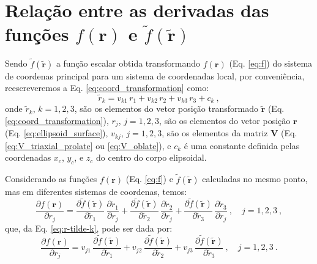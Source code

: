 \chapter{Relação entre as derivadas das funções $f(\mathbf{r})$ e $\tilde{f}(\tilde{\mathbf{r}})$}

Sendo $\tilde{f}(\tilde{\mathbf{r}})$ a função escalar obtida transformando
$f(\mathbf{r})$ (Eq. \ref{eq:f}) do sistema de coordenas principal para um 
sistema de coordenadas local, por conveniência, reescreveremos a Eq. 
\ref{eq:coord_transformation} como:
\begin{equation}
\tilde{r}_{k} = v_{k1} \, r_{1} + v_{k2} \, r_{2} + v_{k3} \, r_{3} + c_{k} \: ,
\label{eq:r-tilde-k}
\end{equation}
onde $\tilde{r}_{k}$, $k = 1, 2, 3$, são os elementos do vetor posição
transformado $\tilde{\mathbf{r}}$ (Eq. \ref{eq:coord_transformation}),
$r_{j}$, $j = 1, 2, 3$, são os elementos do vetor posição
$\mathbf{r}$ (Eq. \ref{eq:ellipsoid_surface}),
$v_{kj}$, $j = 1, 2, 3$, são os elementos da matriz
$\mathbf{V}$ (Eq. \ref{eq:V_triaxial_prolate} ou \ref{eq:V_oblate}),
e $c_{k}$ é uma constante definida pelas coordenadas
$x_{c}$, $y_{c}$, e $z_{c}$ do centro do corpo elipsoidal.

Considerando as funções $f(\mathbf{r})$ 
(Eq. \ref{eq:f}) e $\tilde{f}(\tilde{\mathbf{r}})$
calculadas no mesmo ponto, mas em diferentes sistemas
de coordenas, temos:
\begin{equation*}
\frac{\partial f(\mathbf{r})}{\partial r_{j}} = 
\frac{\partial \tilde{f}(\tilde{\mathbf{r}})}{\partial \tilde{r}_{1}} \,
\frac{\partial \tilde{r}_{1}}{\partial r_{j}} +
\frac{\partial \tilde{f}(\tilde{\mathbf{r}})}{\partial \tilde{r}_{2}} \,
\frac{\partial \tilde{r}_{2}}{\partial r_{j}} +
\frac{\partial \tilde{f}(\tilde{\mathbf{r}})}{\partial \tilde{r}_{3}} \,
\frac{\partial \tilde{r}_{3}}{\partial r_{j}} \: ,
\quad j = 1, 2, 3 \: ,
\end{equation*}
que, da Eq. \ref{eq:r-tilde-k}, pode ser dada por:
\begin{equation}
\frac{\partial f(\mathbf{r})}{\partial r_{j}} = 
v_{j1} \, \frac{\partial \tilde{f}(\tilde{\mathbf{r}})}{\partial \tilde{r}_{1}} +
v_{j2} \, \frac{\partial \tilde{f}(\tilde{\mathbf{r}})}{\partial \tilde{r}_{2}} +
v_{j3} \, \frac{\partial \tilde{f}(\tilde{\mathbf{r}})}{\partial \tilde{r}_{3}} \: ,
\quad j = 1, 2, 3 \: .
\label{eq:df_drj}
\end{equation}

